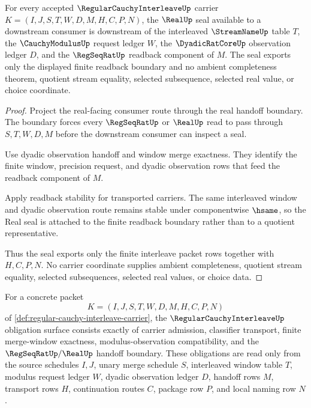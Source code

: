 \begin{lemma}
\label{thm:regular-cauchy-interleave-real-seal}
For every accepted $\RegularCauchyInterleaveUp$ carrier $K=(I,J,S,T,W,D,M,H,C,P,N)$, the $\RealUp$ seal available to a downstream consumer is downstream of the interleaved $\StreamNameUp$ table $T$, the $\CauchyModulusUp$ request ledger $W$, the $\DyadicRatCoreUp$ observation ledger $D$, and the $\RegSeqRatUp$ readback component of $M$. The seal exports only the displayed finite readback boundary and no ambient completeness theorem, quotient stream equality, selected subsequence, selected real value, or choice coordinate.
\end{lemma}
\begin{proof}
Project the real-facing consumer route through the real handoff boundary. The boundary forces every $\RegSeqRatUp$ or $\RealUp$ read to pass through $S,T,W,D,M$ before the downstream consumer can inspect a seal.

Use dyadic observation handoff and window merge exactness. They identify the finite window, precision request, and dyadic observation rows that feed the readback component of $M$.

Apply readback stability for transported carriers. The same interleaved window and dyadic observation route remains stable under componentwise $\hsame$, so the Real seal is attached to the finite readback boundary rather than to a quotient representative.

Thus the seal exports only the finite interleave packet rows together with $H,C,P,N$. No carrier coordinate supplies ambient completeness, quotient stream equality, selected subsequences, selected real values, or choice data.
\end{proof}

\begin{definition}
\label{def:regular-cauchy-interleave-obligation-surface}
For a concrete packet
$$
K=(I,J,S,T,W,D,M,H,C,P,N)
$$
of \autoref{def:regular-cauchy-interleave-carrier}, the $\RegularCauchyInterleaveUp$ obligation surface consists exactly of carrier admission, classifier transport, finite merge-window exactness, modulus-observation compatibility, and the $\RegSeqRatUp/\RealUp$ handoff boundary. These obligations are read only from the source schedules $I,J$, unary merge schedule $S$, interleaved window table $T$, modulus request ledger $W$, dyadic observation ledger $D$, handoff rows $M$, transport rows $H$, continuation routes $C$, package row $P$, and local naming row $N$.
\end{definition}

